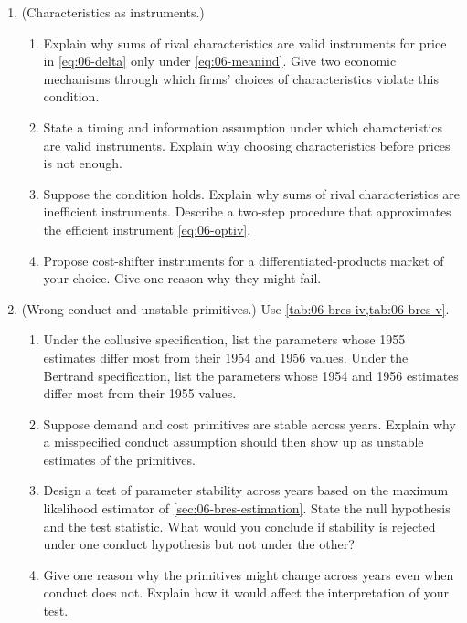 \begin{enumerate}[label=\arabic*., leftmargin=*, itemsep=6pt]
\item (Characteristics as instruments.)
\begin{enumerate}[label=(\alph*)]
  \item Explain why sums of rival characteristics are valid instruments for price in \eqref{eq:06-delta} only under
  \eqref{eq:06-meanind}. Give two economic mechanisms through which firms' choices of characteristics violate this
  condition.
  \item State a timing and information assumption under which characteristics are valid instruments. Explain why
  choosing characteristics before prices is not enough.
  \item Suppose the condition holds. Explain why sums of rival characteristics are inefficient instruments. Describe a
  two-step procedure that approximates the efficient instrument \eqref{eq:06-optiv}.
  \item Propose cost-shifter instruments for a differentiated-products market of your choice. Give one reason why they
  might fail.
\end{enumerate}

\item (Wrong conduct and unstable primitives.) Use \cref{tab:06-bres-iv,tab:06-bres-v}.
\begin{enumerate}[label=(\alph*)]
  \item Under the collusive specification, list the parameters whose 1955 estimates differ most from their 1954 and
  1956 values. Under the Bertrand specification, list the parameters whose 1954 and 1956 estimates differ most from
  their 1955 values.
  \item Suppose demand and cost primitives are stable across years. Explain why a misspecified conduct assumption
  should then show up as unstable estimates of the primitives.
  \item Design a test of parameter stability across years based on the maximum likelihood estimator of
  \cref{sec:06-bres-estimation}. State the null hypothesis and the test statistic. What would you conclude if stability
  is rejected under one conduct hypothesis but not under the other?
  \item Give one reason why the primitives might change across years even when conduct does not. Explain how it would
  affect the interpretation of your test.
\end{enumerate}

\end{enumerate}

